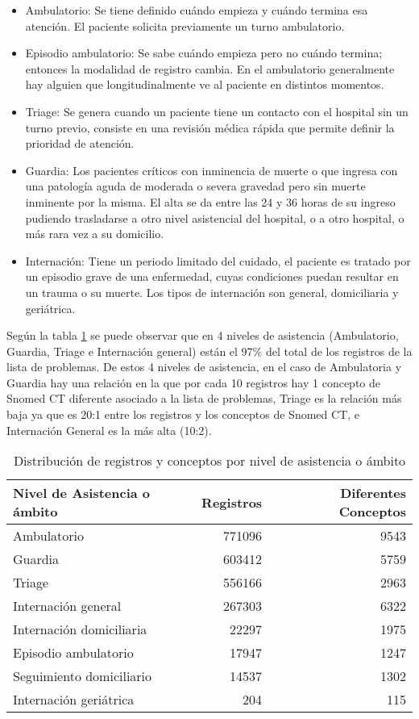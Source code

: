 \begin{itemize}
\item Ambulatorio: Se tiene definido cuándo empieza y cuándo termina esa atención. El paciente solicita previamente un turno ambulatorio.
\item Episodio ambulatorio: Se sabe cuándo empieza pero no cuándo termina; entonces la modalidad de registro cambia. En el ambulatorio generalmente hay alguien que longitudinalmente ve al paciente en distintos momentos.
\item Triage: Se genera cuando un paciente tiene un contacto con el hospital sin un turno previo, consiste en una revisión médica rápida que permite definir la prioridad de atención.
\item Guardia: Los pacientes críticos con inminencia de muerte o que ingresa con una patología aguda de moderada o severa gravedad pero sin muerte inminente por la misma. El alta se da entre las 24 y 36 horas de su ingreso pudiendo trasladarse a otro nivel asistencial del hospital, o a otro hospital, o más rara vez a su domicilio.
\item Internación: Tiene un periodo limitado del cuidado, el paciente es tratado por un episodio grave de una enfermedad, cuyas condiciones puedan resultar en un trauma o su muerte. Los tipos de internación son general, domiciliaria y geriátrica.
\end{itemize}

Según la tabla \ref{nivel_asistencia} se puede observar que en 4 niveles de asistencia (Ambulatorio, Guardia, Triage e Internación general) están el 97\% del total de los registros de la lista de problemas. De estos 4 niveles de asistencia, en el caso de Ambulatoria y Guardia hay una relación en la que por cada 10 registros hay 1 concepto de Snomed CT diferente asociado a la lista de problemas, Triage es la relación más baja ya que es 20:1 entre los registros y los conceptos de Snomed  CT, e Internación General es la más alta (10:2).

\begin{table}[tb]
\centering
\caption{Distribución de registros y conceptos por nivel de asistencia o ámbito }
\label{nivel_asistencia}
\begin{tabular}{@{}lrr@{}}
\toprule
Nivel de Asistencia o ámbito & Registros & Diferentes Conceptos \\ \midrule
Ambulatorio & \num{771096} & \num{9543} \\
Guardia & \num{603412} & \num{5759} \\
Triage & \num{556166} & \num{2963} \\
Internación general & \num{267303} & \num{6322} \\
Internación domiciliaria & \num{22297} & \num{1975}\\
Episodio ambulatorio & \num{17947} & \num{1247} \\
Seguimiento domiciliario & \num{14537} & \num{1302} \\
Internación geriátrica & \num{204} & \num{115} \\ \bottomrule
\end{tabular}
\end{table}

